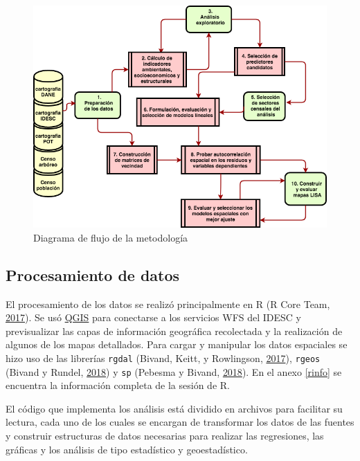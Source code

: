 \documentclass[12pt,a4paper,openany]{book}
\theoremstyle{definition}
\theoremstyle{definition}
\theoremstyle{definition}
\theoremstyle{remark}
\begin{document}
\begin{figure}[H]

{\centering \includegraphics[width=1\linewidth]{images/flujograma} 

}

\caption{Diagrama de flujo de la metodología}\label{fig:flujograma}
\end{figure}

\subsection{Procesamiento de datos}\label{procesamiento-de-datos}

El procesamiento de los datos se realizó principalmente en R (R Core
Team, \protect\hyperlink{ref-R-base}{2017}). Se usó
\href{http://www.qgis.org/es/site/}{QGIS} para conectarse a los
servicios WFS del IDESC y previsualizar las capas de información
geográfica recolectada y la realización de algunos de los mapas
detallados. Para cargar y manipular los datos espaciales se hizo uso de
las librerías \texttt{rgdal} (Bivand, Keitt, y Rowlingson,
\protect\hyperlink{ref-R-rgdal}{2017}), \texttt{rgeos} (Bivand y Rundel,
\protect\hyperlink{ref-R-rgeos}{2018}) y \texttt{sp} (Pebesma y Bivand,
\protect\hyperlink{ref-R-sp}{2018}). En el anexo \ref{rinfo} se
encuentra la información completa de la sesión de R.

El código que implementa los análisis está dividido en archivos para
facilitar su lectura, cada uno de los cuales se encargan de transformar
los datos de las fuentes y construir estructuras de datos necesarias
para realizar las regresiones, las gráficas y los análisis de tipo
estadístico y geoestadístico.
\end{document}
